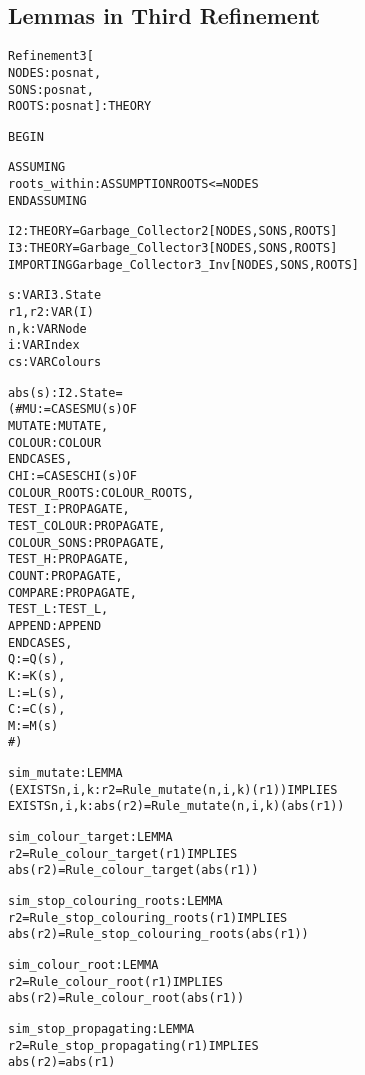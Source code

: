 
\newpage
\subsection{Lemmas in Third Refinement}

\begin{alltt}
%%%%%%%%%%%%%%%%%%%%%%%%%%%%%%%%%%%%%%%%%%%%%%%%
% Refinement3 :                                %
%   Applies the ``Refinement'' theory to yield %
%   the third refinement lemma ``R3''.         %
%%%%%%%%%%%%%%%%%%%%%%%%%%%%%%%%%%%%%%%%%%%%%%%%

Refinement3[
  NODES : posnat, 
  SONS  : posnat, 
  ROOTS : posnat] : THEORY

BEGIN

  ASSUMING
    roots_within : ASSUMPTION ROOTS <= NODES
  ENDASSUMING

  I2 : THEORY = Garbage_Collector2[NODES,SONS,ROOTS]
  I3 : THEORY = Garbage_Collector3[NODES,SONS,ROOTS]
  IMPORTING Garbage_Collector3_Inv[NODES,SONS,ROOTS]

  s     : VAR I3.State
  r1,r2 : VAR (I)
  n,k   : VAR Node
  i     : VAR Index
  cs    : VAR Colours

  abs(s):I2.State = 
    (# MU := CASES MU(s) OF
               MUTATE : MUTATE,
               COLOUR : COLOUR
             ENDCASES,
       CHI := CASES CHI(s) OF
                COLOUR_ROOTS : COLOUR_ROOTS,
                      TEST_I : PROPAGATE,
                 TEST_COLOUR : PROPAGATE,
                 COLOUR_SONS : PROPAGATE,
                      TEST_H : PROPAGATE, 
                       COUNT : PROPAGATE,
                     COMPARE : PROPAGATE,
                      TEST_L : TEST_L,
                      APPEND : APPEND
              ENDCASES,
       Q := Q(s),
       K := K(s),
       L := L(s),
       C := C(s),
       M := M(s)
     #)

  sim_mutate : LEMMA
    (EXISTS n,i,k: r2 = Rule_mutate(n,i,k)(r1)) IMPLIES
      EXISTS n,i,k: abs(r2) = Rule_mutate(n,i,k)(abs(r1))

  sim_colour_target : LEMMA
    r2 = Rule_colour_target(r1) IMPLIES
      abs(r2) = Rule_colour_target(abs(r1))

  sim_stop_colouring_roots : LEMMA
    r2 = Rule_stop_colouring_roots(r1) IMPLIES
      abs(r2) = Rule_stop_colouring_roots(abs(r1))

  sim_colour_root : LEMMA
    r2 = Rule_colour_root(r1) IMPLIES
      abs(r2) = Rule_colour_root(abs(r1))

  sim_stop_propagating : LEMMA
    r2 = Rule_stop_propagating(r1) IMPLIES
      abs(r2) = abs(r1)


\end{alltt}
